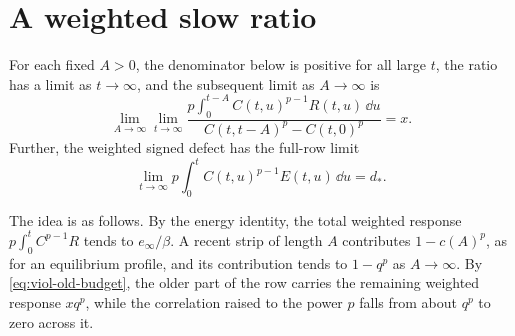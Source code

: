 \section{A weighted slow ratio}\label{sec:viol-weighted-ratio}

\begin{proposition}
\label{resp:weighted-ratio}
For each fixed $A>0$, the denominator below is positive for all large $t$, the ratio has a limit as $t\to\infty$, and the subsequent limit as $A\to\infty$ is
\begin{equation}
 \lim_{A\to\infty}\lim_{t\to\infty}
 \frac{p\int_0^{t-A}C(t,u)^{p-1}R(t,u)\,\dd u}
      {C(t,t-A)^p-C(t,0)^p}=x.
 \label{resp:weighted-ratio-limit}
\end{equation}
Further, the weighted signed defect has the full-row limit
\begin{equation}
 \lim_{t\to\infty}p\int_0^tC(t,u)^{p-1}E(t,u)\,\dd u=d_*.
 \label{resp:weighted-defect}
\end{equation}
\end{proposition}

The idea is as follows. By the energy identity, the total weighted response $p\int_0^tC^{p-1}R$ tends to $e_\infty/\beta$. A recent strip of length $A$ contributes $1-c(A)^p$, as for an equilibrium profile, and its contribution tends to $1-q^p$ as $A\to\infty$. By \eqref{eq:viol-old-budget}, the older part of the row carries the remaining weighted response $xq^p$, while the correlation raised to the power $p$ falls from about $q^p$ to zero across it.

